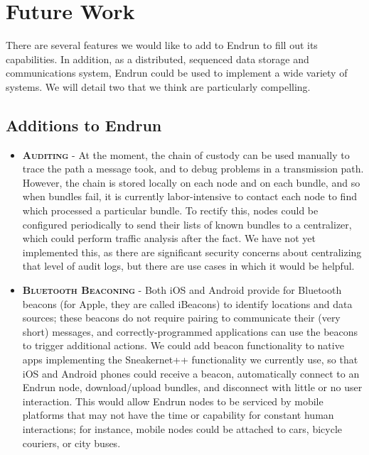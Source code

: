 \documentclass[12pt]{article}
\begin{document}
  \section{Future Work}
  
  There are several features we would like to add to Endrun to fill out its capabilities. In addition, as a distributed, sequenced data storage and communications system, Endrun could be used to implement a wide variety of systems. We will detail two that we think are particularly compelling.
  
  \subsection{Additions to Endrun}
  
  \begin{itemize}
    \item \textbf{\textsc{Auditing}} - At the moment, the chain of custody can be used manually to trace the path a message took, and to debug problems in a transmission path. However, the chain is stored locally on each node and on each bundle, and so when bundles fail, it is currently labor-intensive to contact each node to find which processed a particular bundle. To rectify this, nodes could be configured periodically to send their lists of known bundles to a centralizer, which could perform traffic analysis after the fact. We have not yet implemented this, as there are significant security concerns about centralizing that level of audit logs, but there are use cases in which it would be helpful.
    
    \item \textbf{\textsc{Bluetooth Beaconing}} - Both iOS and Android provide for Bluetooth beacons (for Apple, they are called iBeacons) to identify locations and data sources; these beacons do not require pairing to communicate their (very short) messages, and correctly-programmed applications can use the beacons to trigger additional actions. We could add beacon functionality to native apps implementing the Sneakernet++ functionality we currently use, so that iOS and Android phones could receive a beacon, automatically connect to an Endrun node, download/upload bundles, and disconnect with little or no user interaction. This would allow Endrun nodes to be serviced by mobile platforms that may not have the time or capability for constant human interactions; for instance, mobile nodes could be attached to cars, bicycle couriers, or city buses.
  \end{itemize}
  
\end{document}
